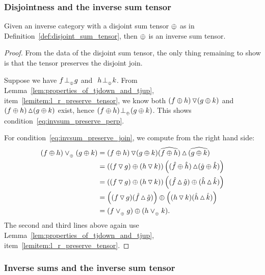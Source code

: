 \subsubsection{Disjointness and the inverse sum tensor} %
\label{ssub:disjointness_and_the_inverse_sum_tensor}
\begin{lemma}\label{lem:a_disjoint_sum_tensor_is_an_inverse_sum_tensor}
  Given an inverse category \X with a disjoint sum tensor $\oplus$ as in
  Definition~\ref{def:disjoint_sum_tensor}, then $\oplus$ is an inverse sum tensor.
\end{lemma}
\begin{proof}
  From the data of the disjoint sum tensor, the only thing remaining to show is that the tensor
  preserves the disjoint join.

  Suppose we have $f {}_{{}_{}}{\perp_{{}_{\oplus}}} g$ and $\ h {}_{{}_{}}{\perp_{{}_{\oplus}}} k$.
  From Lemma~\ref{lem:properties_of_tjdown_and_tjup}, item~\ref{lemitem:l_r_preserve_tensor}, we
  know both $(f\oplus h)\operatorname{\triangledown}(g\oplus k)$ and $(f\oplus h)\operatorname{\vartriangle}(g\oplus k)$ exist, hence $(f\oplus h){}_{{}_{}}{\perp_{{}_{\oplus}}}(g\oplus k)$.
  This shows condition~\eqref{eq:invsum_preserve_perp}.

  For condition~\eqref{eq:invsum_preserve_join}, we compute from the right hand side:
  \begin{align*}
    (f\oplus h)\vee_{{_{\oplus}}}(g\oplus k) &= (f\oplus h)\operatorname{\triangledown} (g\oplus k) \widehat{(f\oplus h)}\operatorname{\vartriangle} \widehat{(g\oplus k)}\\
    &= \left( (f\operatorname{\triangledown} g)\oplus (h \operatorname{\triangledown} k) \right)
       \left( (\hat{f}\oplus\hat{h}) \operatorname{\vartriangle} (\hat{g}\oplus\hat{k}) \right) \\
    &= \left( (f\operatorname{\triangledown} g)\oplus (h \operatorname{\triangledown} k) \right)
       \left( (\hat{f}\operatorname{\vartriangle} \hat{g}) \oplus (\hat{h}\operatorname{\vartriangle}\hat{k}) \right) \\
    &= \left( (f\operatorname{\triangledown} g)(\hat{f}\operatorname{\vartriangle} \hat{g})\right) \oplus
       \left((h \operatorname{\triangledown} k) (\hat{h}\operatorname{\vartriangle}\hat{k}) \right) \\
    &=  (f\vee_{{_{\oplus}}} g)\oplus(h \vee_{{_{\oplus}}} k).
  \end{align*}
  The second and third lines above again use Lemma~\ref{lem:properties_of_tjdown_and_tjup},
  item~\ref{lemitem:l_r_preserve_tensor}.

\end{proof}

\subsubsection{Inverse sums and the inverse sum tensor} %
\label{ssub:inverse_sums_and_the_inverse_sum_tensor}


